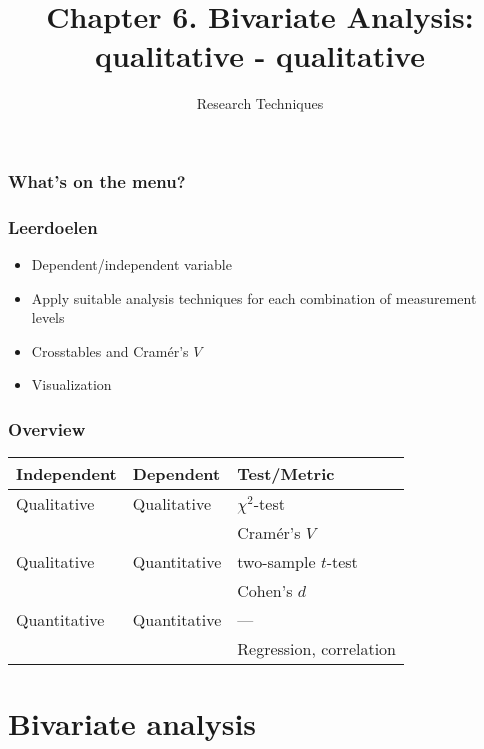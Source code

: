 \documentclass[aspectratio=169]{beamer}
\title{Chapter 6. Bivariate Analysis: qualitative - qualitative}
\subtitle{Research Techniques}
\begin{document}
\begin{frame}
  \maketitle
\end{frame}

\begin{frame}
  \frametitle{What's on the menu?}
  
  \tableofcontents
\end{frame}

\begin{frame}
  \frametitle{Leerdoelen}
  
  \begin{itemize}
    \item Dependent/independent variable
    \item Apply suitable analysis techniques for each combination of measurement levels
    \item Crosstables and Cramér's $V$
    \item Visualization
  \end{itemize}
\end{frame}

\begin{frame}
  \frametitle{Overview}
    \centering
    \begin{tabular}{lll}
      \toprule
      \textbf{Independent}    & \textbf{Dependent}    & \textbf{Test/Metric}          \\
      \midrule
      Qualitative             & Qualitative           & $\chi^2$-test                 \\
                              &                       & Cramér's $V$                  \\
      Qualitative             & Quantitative          & two-sample $t$-test           \\
    	                        &                       & Cohen's $d$                   \\
      Quantitative            & Quantitative          & ---                           \\
    	                        &                       & Regression, correlation       \\
    	\bottomrule
    \end{tabular}
\end{frame}

\section{Bivariate analysis}
\end{document}
